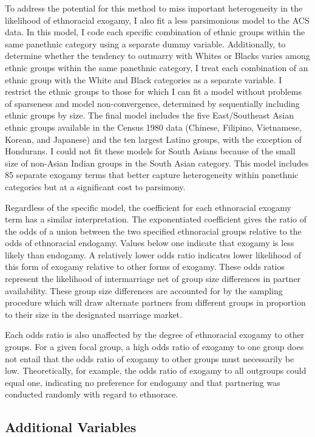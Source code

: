 \documentclass[11pt,]{article}
\begin{document}
To address the potential for this method to miss important heterogeneity in the likelihood of ethnoracial exogamy, I also fit a less parsimonious model to the ACS data. In this model, I code each specific combination of ethnic groups within the same panethnic category using a separate dummy variable. Additionally, to determine whether the tendency to outmarry with Whites or Blacks varies among ethnic groups within the same panethnic category, I treat each combination of an ethnic group with the White and Black categories as a separate variable. I restrict the ethnic groups to those for which I can fit a model without problems of sparseness and model non-convergence, determined by sequentially including ethnic groups by size. The final model includes the five East/Southeast Asian ethnic groups available in the Census 1980 data (Chinese, Filipino, Vietnamese, Korean, and Japanese) and the ten largest Latino groups, with the exception of Hondurans. I could not fit these models for South Asians because of the small size of non-Asian Indian groups in the South Asian category. This model includes 85 separate exogamy terms that better capture heterogeneity within panethnic categories but at a significant cost to parsimony.

Regardless of the specific model, the coefficient for each ethnoracial exogamy term has a similar interpretation. The exponentiated coefficient gives the ratio of the odds of a union between the two specified ethnoracial groups relative to the odds of ethnoracial endogamy. Values below one indicate that exogamy is less likely than endogamy. A relatively lower odds ratio indicates lower likelihood of this form of exogamy relative to other forms of exogamy. These odds ratios represent the likelihood of intermarriage net of group size differences in partner availability. These group size differences are accounted for by the sampling procedure which will draw alternate partners from different groups in proportion to their size in the designated marriage market.

Each odds ratio is also unaffected by the degree of ethnoracial exogamy to other groups. For a given focal group, a high odds ratio of exogamy to one group does not entail that the odds ratio of exogamy to other groups must necessarily be low. Theoretically, for example, the odds ratio of exogamy to all outgroups could equal one, indicating no preference for endogamy and that partnering was conducted randomly with regard to ethnorace.

\hypertarget{additional-variables}{%
\subsection{Additional Variables}\label{additional-variables}}
\end{document}

